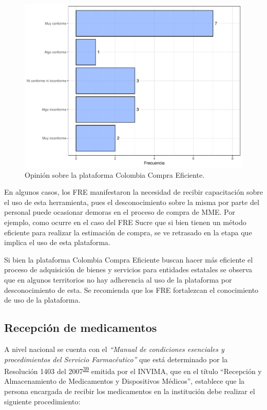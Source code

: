 \documentclass[
  oneside]{book}
\begin{document}
\begin{figure}[t]

{\centering \includegraphics[width=1\linewidth]{InformeFinal_files/figure-latex/ColombiaCompra-1} 

}

\caption{Opinión sobre la plataforma Colombia Compra Eficiente.}\label{fig:ColombiaCompra}
\end{figure}

En algunos casos, los FRE manifestaron la necesidad de recibir capacitación sobre el uso de esta herramienta, pues el desconocimiento sobre la misma por parte del personal puede ocasionar demoras en el proceso de compra de MME. Por ejemplo, como ocurre en el caso del FRE Sucre que si bien tienen un método eficiente para realizar la estimación de compra, se ve retrasado en la etapa que implica el uso de esta plataforma.

Si bien la plataforma Colombia Compra Eficiente buscan hacer más eficiente el proceso de adquisición de bienes y servicios para entidades estatales se observa que en algunos territorios no hay adherencia al uso de la plataforma por desconocimiento de esta. Se recomienda que los FRE fortalezcan el conocimiento de uso de la plataforma.

\hypertarget{recepciuxf3n-de-medicamentos}{%
\subsection{Recepción de medicamentos}\label{recepciuxf3n-de-medicamentos}}

A nivel nacional se cuenta con el \emph{``Manual de condiciones esenciales y procedimientos del Servicio Farmacéutico''} que está determinado por la Resolución 1403 del 2007\textsuperscript{\protect\hyperlink{ref-MinisteriodeSaludyProteccionSocial2007}{39}} emitida por el INVIMA, que en el título ``Recepción y Almacenamiento de Medicamentos y Dispositivos Médicos'', establece que la persona encargada de recibir los medicamentos en la institución debe realizar el siguiente procedimiento:
\end{document}
